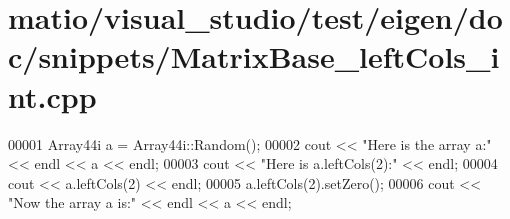 \hypertarget{matio_2visual__studio_2test_2eigen_2doc_2snippets_2_matrix_base__left_cols__int_8cpp_source}{}\section{matio/visual\+\_\+studio/test/eigen/doc/snippets/\+Matrix\+Base\+\_\+left\+Cols\+\_\+int.cpp}
\label{matio_2visual__studio_2test_2eigen_2doc_2snippets_2_matrix_base__left_cols__int_8cpp_source}

\begin{DoxyCode}
00001 Array44i a = Array44i::Random();
00002 cout << \textcolor{stringliteral}{"Here is the array a:"} << endl << a << endl;
00003 cout << \textcolor{stringliteral}{"Here is a.leftCols(2):"} << endl;
00004 cout << a.leftCols(2) << endl;
00005 a.leftCols(2).setZero();
00006 cout << \textcolor{stringliteral}{"Now the array a is:"} << endl << a << endl;
\end{DoxyCode}
